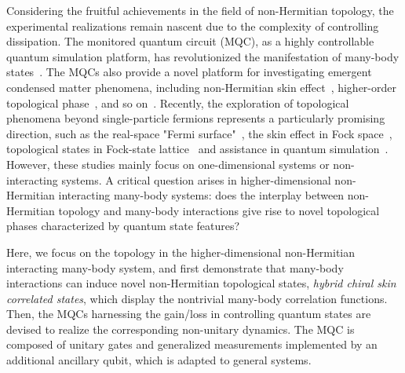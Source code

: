 \documentclass[longbibliography, aps, prx, amsmath, amssymb, amsfonts, twocolumn,superscriptaddress, footinbib]{revtex4-1}
\begin{document}
	Considering the fruitful achievements in the field of non-Hermitian topology, the experimental realizations remain nascent due to the complexity of controlling dissipation.
    The monitored quantum circuit (MQC), as a highly controllable quantum simulation platform, has revolutionized the manifestation of many-body states~\cite{skinner2019measurement,nahum2017quantum,gullans2020dynamical,koh2023measurement,li2023cross,choi2020quantum,minato2022fate,yang2025bridging,potter2022entanglement,iqbal2024non,zhang2025physics}. 
	The MQCs also provide a novel platform for investigating emergent condensed matter phenomena, including non-Hermitian skin effect~\cite{fleckenstein2022non}, higher-order topological phase~\cite{koh2024realization}, and so on~\cite{iqbal2024non}. Recently, the exploration of topological phenomena beyond single-particle fermions represents a particularly promising direction, such as the real-space "Fermi surface"~\cite{shen2025observation}, the skin effect in Fock space~\cite{shen2024enhanced,shimomura2024general}, topological states in Fock-state lattice~\cite{deng2022observing} and assistance in quantum simulation~\cite{zhao2025}. However, these studies mainly focus on one-dimensional systems or non-interacting systems. A critical question arises in higher-dimensional non-Hermitian interacting many-body systems: does the interplay between non-Hermitian topology and many-body interactions give rise to novel topological phases characterized by quantum state features? 

	
	Here, we focus on the topology in the higher-dimensional non-Hermitian interacting many-body system, and first demonstrate that many-body interactions can induce novel non-Hermitian topological states, \textit{hybrid chiral skin correlated states}, which display the nontrivial many-body correlation functions. Then, the MQCs harnessing the gain/loss in controlling quantum states are devised to realize the corresponding non-unitary dynamics. The MQC is composed of unitary gates and generalized measurements implemented by an additional ancillary qubit, which is adapted to general systems.
    
\end{document}
